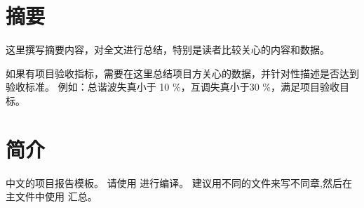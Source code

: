 \documentclass{ProjectReportCn}
\begin{document}
\tableofcontents

\thispagestyle{firststyle}

\clearpage
\renewcommand{\listfigurename}{图索引} %
\listoffigures


\clearpage
\renewcommand{\listtablename}{表索引}
{}
\listoftables

\clearpage
{}
{} %
\printglossary[type=\acronymtype, title={缩写索引}, nonumberlist=false] %


\chapter*{摘要}
这里撰写摘要内容，对全文进行总结，特别是读者比较关心的内容和数据。

如果有项目验收指标，需要在这里总结项目方关心的数据，并针对性描述是否达到验收标准。
例如：总谐波失真小于 10 \%，互调失真小于30 \%，满足项目验收目标。

\chapter{简介}
中文的项目报告模板。
请使用 \XeLaTeX 进行编译。
建议用不同的文件来写不同章,然后在主文件中使用 \lstinline!! 汇总。




\begin{appendices}

    
    
\end{appendices}


\printbibliography[heading=bibintoc, title=参考文献]

% 
\end{document}
